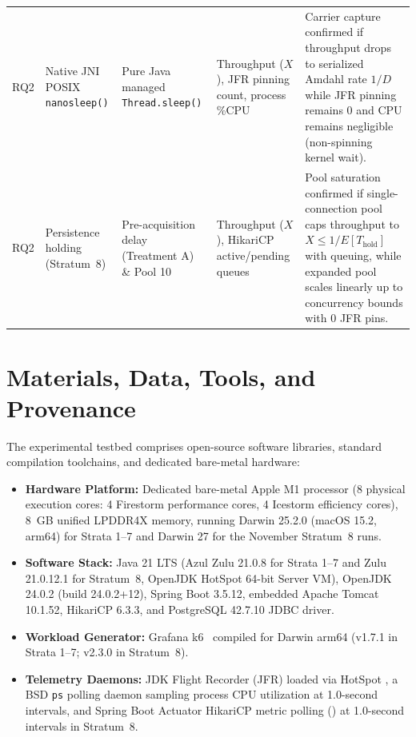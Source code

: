 \begin{table}[htbp]
\begin{tabularx}{\textwidth}{@{}l>{\raggedright\arraybackslash}p{}>{\raggedright\arraybackslash}p{}>{\raggedright\arraybackslash}p{}>{\raggedright\arraybackslash}X@{}}
    \addlinespace
    RQ2 & Native JNI POSIX \texttt{nanosleep()} & Pure Java managed \texttt{Thread.sleep()} & Throughput ($X$), JFR pinning count, process \%CPU & Carrier capture confirmed if throughput drops to serialized Amdahl rate $1/D$ while JFR pinning remains 0 and CPU remains negligible (non-spinning kernel wait). \\
    \addlinespace
    RQ2 & Persistence holding (Stratum~8) & Pre-acquisition delay (Treatment A) \& Pool 10 & Throughput ($X$), HikariCP active/pending queues & Pool saturation confirmed if single-connection pool caps throughput to $X \le 1/E[T_{\text{hold}}]$ with queuing, while expanded pool scales linearly up to concurrency bounds with 0 JFR pins. \\
    \bottomrule
  \end{tabularx}
\end{table}

\section{Materials, Data, Tools, and Provenance}
\label{sec:materials-provenance}

The experimental testbed comprises open-source software libraries, standard compilation toolchains, and dedicated bare-metal hardware:
\begin{itemize}
  \item \textbf{Hardware Platform:} Dedicated bare-metal Apple M1 processor (8 physical execution cores: 4 Firestorm performance cores, 4 Icestorm efficiency cores), 8~GB unified LPDDR4X memory, running Darwin 25.2.0 (macOS 15.2, arm64) for Strata 1--7 and Darwin 27 for the November Stratum~8 runs.
  \item \textbf{Software Stack:} Java 21 LTS (Azul Zulu 21.0.8 for Strata 1--7 and Zulu 21.0.12.1 for Stratum~8, OpenJDK HotSpot 64-bit Server VM), OpenJDK 24.0.2 (build 24.0.2+12), Spring Boot 3.5.12, embedded Apache Tomcat 10.1.52, HikariCP 6.3.3, and PostgreSQL 42.7.10 JDBC driver.
  \item \textbf{Workload Generator:} Grafana k6~\cite{GrafanaK6} compiled for Darwin arm64 (v1.7.1 in Strata 1--7; v2.3.0 in Stratum~8).
  \item \textbf{Telemetry Daemons:} JDK Flight Recorder (JFR) loaded via HotSpot , a BSD \texttt{ps} polling daemon sampling process CPU utilization at 1.0-second intervals, and Spring Boot Actuator HikariCP metric polling () at 1.0-second intervals in Stratum~8.
\end{itemize}

